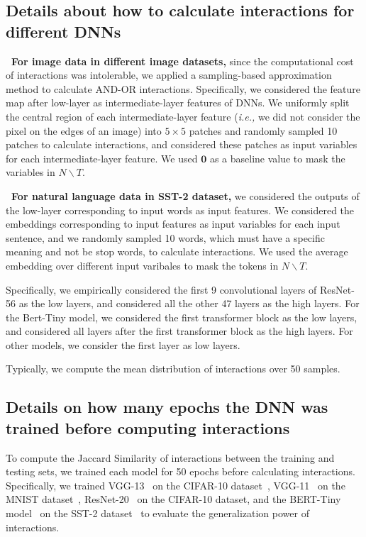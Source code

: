 \documentclass[10pt,twocolumn,letterpaper]{article}
\begin{document}
\subsection{Details about how to calculate interactions for different DNNs}\label{sec:players}
\textbf{\textbullet \ For image data in different image datasets,} since the computational cost of interactions was intolerable, we applied a sampling-based approximation method to calculate AND-OR interactions. Specifically, we considered the feature map after low-layer as intermediate-layer features of DNNs. We uniformly split  the central region of each intermediate-layer feature (\emph{i.e.,} we did not consider the pixel on the edges of an image) into $5 \times 5$ patches and randomly sampled 10 patches to calculate interactions, and considered these patches as input variables for each intermediate-layer feature. We used $\mathbf{0}$ as a baseline value to mask the variables in $N \backslash T$.

\textbf{\textbullet \ For natural language data in SST-2 dataset,} we considered the outputs of the low-layer corresponding to input words as input features. We considered the embeddings corresponding to input features as input variables for each input sentence, and we randomly sampled 10 words, which must have a specific meaning and not be stop words, to calculate interactions. We used the average embedding over different input varibales to mask the tokens in $N \backslash T$.

Specifically, we empirically considered the first 9 convolutional layers of ResNet-56 as the low layers, and considered all the other 47 layers as the high layers. For the Bert-Tiny model, we considered the first transformer block as the low layers, and considered all layers after the first transformer block as the high layers. For other models, we consider the first layer as low layers.

Typically, we compute the mean distribution of interactions over 50 samples.

\subsection{Details on how many epochs the DNN was trained before computing interactions}\label{appendix-sec-epochs}
To compute the Jaccard Similarity of interactions between the training and testing sets, we trained each model for 50 epochs before calculating interactions. Specifically, we trained VGG-13~\citep{simonyan2014very} on the CIFAR-10 dataset~\citep{krizhevsky2009learning}, VGG-11~\citep{simonyan2014very} on the MNIST dataset~\citep{lecun1998gradient}, ResNet-20~\citep{he2016deep} on the CIFAR-10 dataset, and the BERT-Tiny model~\citep{devlin2018bert} on the SST-2 dataset~\citep{socher2013recursive} to evaluate the generalization power of interactions.
\end{document}
